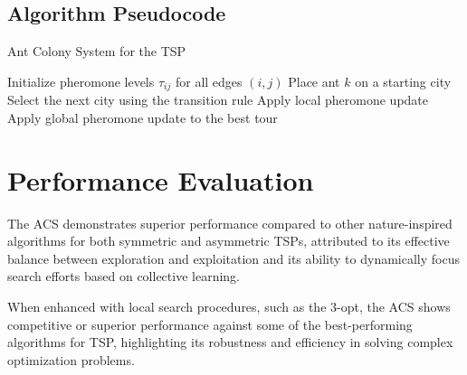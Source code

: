 \subsection{Algorithm Pseudocode}

\begin{algorithm}
	\caption{Ant Colony System for the TSP}
	\begin{algorithmic}[1]
		\State Initialize pheromone levels $\tau_{ij}$ for all edges $(i,j)$
		\State Place ant $k$ on a starting city
		\Repeat
		\State Select the next city using the transition rule
		\State Apply local pheromone update
		\EndFor
		\State Apply global pheromone update to the best tour
		\EndFor
	\end{algorithmic}
\end{algorithm}

\section{Performance Evaluation}

The ACS demonstrates superior performance compared to other nature-inspired algorithms for both symmetric and asymmetric TSPs, attributed to its effective balance between exploration and exploitation and its ability to dynamically focus search efforts based on collective learning.

When enhanced with local search procedures, such as the 3-opt, the ACS shows competitive or superior performance against some of the best-performing algorithms for TSP, highlighting its robustness and efficiency in solving complex optimization problems.
